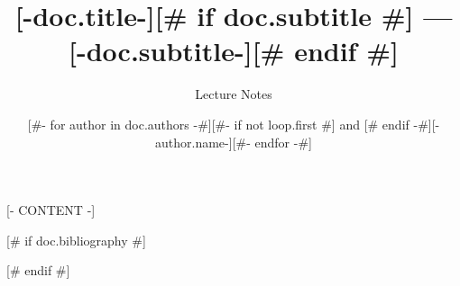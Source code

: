 \documentclass[english,course,theoremsection,cleardoublepage]{lecture}
\title{[-doc.title-][# if doc.subtitle #] --- [-doc.subtitle-][# endif #]}
\subtitle{Lecture Notes}
\author{[#- for author in doc.authors -#][#- if not loop.first #] and [# endif -#][-author.name-][#- endfor -#]}
\theoremstyle{plainsc}
\theoremstyle{remarksc}
\begin{document}
[- CONTENT -]

[# if doc.bibliography #]


[# endif #]
\end{document}

